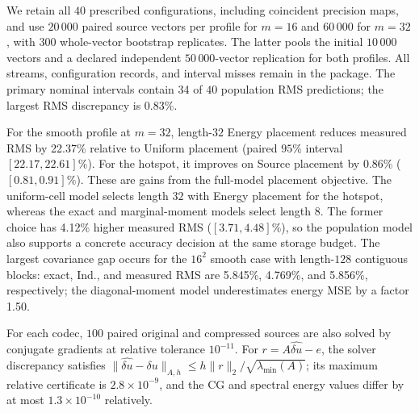 We retain all $40$ prescribed configurations, including coincident
precision maps, and use $20\,000$ paired source vectors per profile for
$m=16$ and $60\,000$ for $m=32$, with $300$ whole-vector bootstrap
replicates. The latter pools the initial $10\,000$ vectors and a declared
independent $50\,000$-vector replication for both profiles. All streams,
configuration records, and interval misses remain in the package.
The primary nominal intervals contain 34 of $40$ population RMS predictions;
the largest RMS discrepancy is 0.83\%.



For the smooth profile at $m=32$, length-$32$ Energy placement reduces
measured RMS by 22.37\% relative to Uniform placement
(paired $95\%$ interval $[22.17,22.61]\%$).
For the hotspot, it improves on Source placement by 0.86\%
($[0.81,0.91]\%$). These are gains from the full-model
placement objective. The uniform-cell model selects length $32$ with
Energy placement for the hotspot, whereas the exact and marginal-moment
models select length $8$. The former choice has 4.12\% higher
measured RMS ($[3.71,4.48]\%$), so the population model
also supports a concrete accuracy decision at the same storage budget.
The largest covariance gap occurs for the $16^2$ smooth case with
length-$128$ contiguous blocks: exact, Ind., and measured RMS are
5.845\%, 4.769\%, and 5.856\%, respectively;
the diagonal-moment model underestimates energy MSE by a factor 1.50.

For each codec, $100$ paired original and compressed sources are also
solved by conjugate gradients at relative tolerance $10^{-11}$.
For $r=A\widehat{\delta u}-e$, the solver discrepancy satisfies
$\|\widehat{\delta u}-\delta u\|_{A,h}\le h\|r\|_2/
\sqrt{\lambda_{\min}(A)}$; its maximum relative certificate is
$2.8\times10^{-9}$, and the CG and spectral energy values differ by
at most $1.3\times10^{-10}$ relatively.
